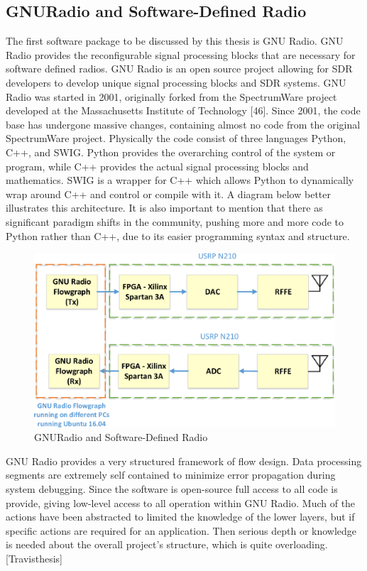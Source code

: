 \subsection{GNURadio and Software-Defined Radio}
The first software package to be discussed by this thesis is GNU Radio. GNU Radio provides the reconfigurable signal processing blocks that are necessary for software defined
radios. GNU Radio is an open source project allowing for SDR developers to develop unique signal processing blocks and SDR systems. GNU Radio was started in 2001, originally
forked from the SpectrumWare project developed at the Massachusetts Institute of Technology [46]. Since 2001, the code base has undergone massive changes, containing almost
no code from the original SpectrumWare project. Physically the code consist of three languages Python, C++, and SWIG. Python provides the overarching control of the system or
program, while C++ provides the actual signal processing blocks and mathematics. SWIG is a wrapper for C++ which allows Python to dynamically wrap around C++ and control
or compile with it. A diagram below better illustrates this architecture. It is also important to mention that there as significant paradigm shifts in the community, pushing more and more code to Python rather than C++, due to its easier programming syntax and structure.

\begin{figure}[ht!]
	\centering
	\includegraphics[width=\textwidth,keepaspectratio]{images/Gill/figs/gnuradio.eps}
    \caption{GNURadio and Software-Defined Radio} 
\label{gnuradio}      
\end{figure}

GNU Radio provides a very structured framework of flow design. Data processing segments are extremely self contained to minimize error propagation during system debugging.
Since the software is open-source full access to all code is provide, giving low-level access to all operation within GNU Radio. Much of the actions have been abstracted to limited the
knowledge of the lower layers, but if specific actions are required for an application. Then serious depth or knowledge is needed about the overall project’s structure, which is quite
overloading.[Travisthesis]


